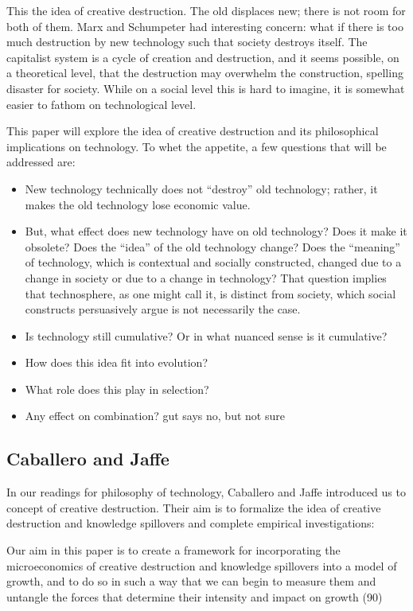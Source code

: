 \documentclass[11pt]{article}
\begin{document}
This the idea of creative destruction.
The old displaces new; there is not room for both of them.
Marx and Schumpeter had interesting concern: what if there is too much destruction by new technology such that society destroys itself.
The capitalist system is a cycle of creation and destruction, and it seems possible, on a theoretical level, that the destruction may overwhelm the construction, spelling disaster for society.
While on a social level this is hard to imagine, it is somewhat easier to fathom on technological level.

This paper will explore the idea of creative destruction and its philosophical implications on technology. 
To whet the appetite, a few questions that will be addressed are:
\begin{itemize}
    \item New technology technically does not ``destroy'' old technology; rather, it makes the old technology lose economic value.
    \item But, what effect does new technology have on old technology? Does it make it obsolete? Does the ``idea'' of the old technology change? Does the ``meaning'' of technology, which is contextual and socially constructed, changed due to a change in society or due to a change in technology? That question implies that technosphere, as one might call it, is distinct from society, which social constructs persuasively argue is not necessarily the case.
    \item Is technology still cumulative? Or in what nuanced sense is it cumulative?
    \item How does this idea fit into evolution?
    \item What role does this play in selection?
    \item Any effect on combination? gut says no, but not sure
\end{itemize}

\subsection{Caballero and Jaffe}
In our readings for philosophy of technology, Caballero and Jaffe introduced us to concept of creative destruction.
Their aim is to formalize the idea of creative destruction and knowledge spillovers and complete empirical investigations:
\begin{displayquote}
    Our aim in this paper is to create a framework for incorporating the microeconomics of creative destruction and knowledge spillovers into a model of growth, and to do so in such a way that we can begin to measure them and untangle the forces that determine their intensity and impact on growth (90)
\end{displayquote}
\end{document}

